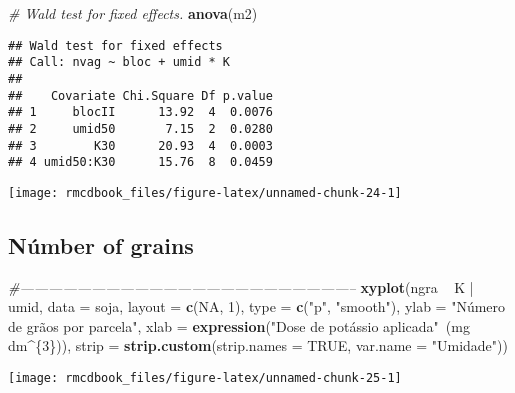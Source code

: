 \documentclass[9pt,a5paper,]{book}
\newenvironment{Shaded}{}{}
\newcommand{\KeywordTok}[1]{\textbf{{#1}}}
\newcommand{\DataTypeTok}[1]{\underline{{#1}}}
\newcommand{\DecValTok}[1]{{#1}}
\newcommand{\StringTok}[1]{{#1}}
\newcommand{\CommentTok}[1]{\textit{{#1}}}
\newcommand{\OtherTok}[1]{{#1}}
\newcommand{\NormalTok}[1]{{#1}}
\renewenvironment{Shaded}{\color{inputcolor}}{}
\renewcommand{\DataTypeTok}[1]{{#1}}
\theoremstyle{definition}
\theoremstyle{definition}
\theoremstyle{remark}
\begin{document}
\begin{Shaded}
\begin{Highlighting}[]
\CommentTok{# Wald test for fixed effects.}
\KeywordTok{anova}\NormalTok{(m2)}
\end{Highlighting}
\end{Shaded}

\begin{verbatim}
## Wald test for fixed effects
## Call: nvag ~ bloc + umid * K
## 
##    Covariate Chi.Square Df p.value
## 1     blocII      13.92  4  0.0076
## 2     umid50       7.15  2  0.0280
## 3        K30      20.93  4  0.0003
## 4 umid50:K30      15.76  8  0.0459
\end{verbatim}

\begin{center}\texttt{[image: rmcdbook\_files/figure-latex/unnamed-chunk-24-1]} \end{center}

\subsection{Númber of grains}\label{number-of-grains}

\begin{Shaded}
\begin{Highlighting}[]
\CommentTok{#-----------------------------------------------------------------------}
\KeywordTok{xyplot}\NormalTok{(ngra ~}\StringTok{ }\NormalTok{K |}\StringTok{ }\NormalTok{umid, }\DataTypeTok{data =} \NormalTok{soja, }\DataTypeTok{layout =} \KeywordTok{c}\NormalTok{(}\OtherTok{NA}\NormalTok{, }\DecValTok{1}\NormalTok{),}
       \DataTypeTok{type =} \KeywordTok{c}\NormalTok{(}\StringTok{"p"}\NormalTok{, }\StringTok{"smooth"}\NormalTok{),}
       \DataTypeTok{ylab =} \StringTok{"Número de grãos por parcela"}\NormalTok{,}
       \DataTypeTok{xlab =} \KeywordTok{expression}\NormalTok{(}\StringTok{"Dose de potássio aplicada"}\NormalTok{~(mg ~}\StringTok{ }\NormalTok{dm^\{}\DecValTok{3}\NormalTok{\})),}
       \DataTypeTok{strip =} \KeywordTok{strip.custom}\NormalTok{(}\DataTypeTok{strip.names =} \OtherTok{TRUE}\NormalTok{, }\DataTypeTok{var.name =} \StringTok{"Umidade"}\NormalTok{))}
\end{Highlighting}
\end{Shaded}

\begin{center}\texttt{[image: rmcdbook\_files/figure-latex/unnamed-chunk-25-1]} \end{center}
\end{document}
